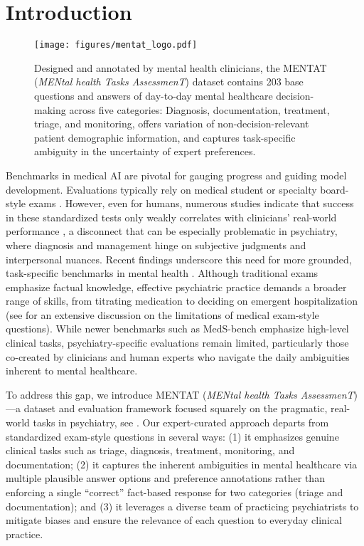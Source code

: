 
\section{Introduction}
\label{sec:1_introduction}

\begin{figure}[ht]
    \vskip 0.2in
    \begin{center}
    \centerline{\texttt{[image: figures/mentat\_logo.pdf]}}
    \caption{
    Designed and annotated by mental health clinicians, the MENTAT (\textit{MENtal health Tasks AssessmenT}) dataset contains 203 base questions and answers of day-to-day mental healthcare decision-making across five categories: Diagnosis, documentation, treatment, triage, and monitoring, offers variation of non-decision-relevant patient demographic information, and captures task-specific ambiguity in the uncertainty of expert preferences.}
    \label{fig:mentat_logo}
    \end{center}
    \vskip -0.2in
\end{figure}

Benchmarks in medical AI are pivotal for gauging progress and guiding model development. Evaluations typically rely on medical student or specialty board-style exams \citep[e.g.][]{Jin2021, pmlr-v174-pal22a}. 
However, even for humans, numerous studies indicate that success in these standardized tests only weakly correlates with clinicians’ real-world performance \cite{Saguil2015}, a disconnect that can be especially problematic in psychiatry, where diagnosis and management hinge on subjective judgments and interpersonal nuances. 
Recent findings underscore this need for more grounded, task-specific benchmarks in mental health \cite{Raji2025}. 
Although traditional exams emphasize factual knowledge, effective psychiatric practice demands a broader range of skills, from titrating medication to deciding on emergent hospitalization (see  for an extensive discussion on the limitations of medical exam-style questions).
While newer benchmarks such as MedS-bench \citep{Wu2025} emphasize high-level clinical tasks, psychiatry-specific evaluations remain limited, particularly those co-created by clinicians and human experts who navigate the daily ambiguities inherent to mental healthcare.

To address this gap, we introduce MENTAT (\textit{MENtal health Tasks AssessmenT})—a dataset and evaluation framework focused squarely on the pragmatic, real-world tasks in psychiatry, see . 
Our expert-curated approach departs from standardized exam-style questions in several ways: 
(1) it emphasizes genuine clinical tasks such as triage, diagnosis, treatment, monitoring, and documentation; 
(2) it captures the inherent ambiguities in mental healthcare via multiple plausible answer options and preference annotations rather than enforcing a single “correct” fact-based response for two categories (triage and documentation); and 
(3) it leverages a diverse team of practicing psychiatrists to mitigate biases and ensure the relevance of each question to everyday clinical practice.

